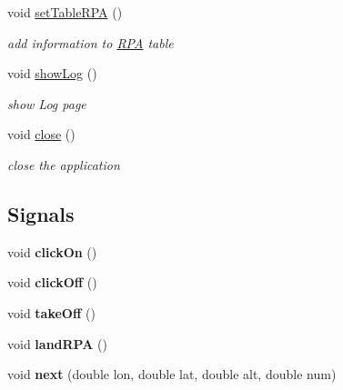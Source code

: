 \begin{DoxyCompactItemize}
\item 
void \hyperlink{class_m_a_r_c_s_aba417ab51a8036d3c855a06c1ce18f6c}{set\-Table\-R\-P\-A} ()
\begin{DoxyCompactList}\small\item\em add information to \hyperlink{class_r_p_a}{R\-P\-A} table \end{DoxyCompactList}\item 
void \hyperlink{class_m_a_r_c_s_aa04920e08a5701d7ff898baab3585277}{show\-Log} ()
\begin{DoxyCompactList}\small\item\em show Log page \end{DoxyCompactList}\item 
void \hyperlink{class_m_a_r_c_s_a21702dae09fe704ca651716e76d48e61}{close} ()
\begin{DoxyCompactList}\small\item\em close the application \end{DoxyCompactList}\end{DoxyCompactItemize}
\subsection*{Signals}
\begin{DoxyCompactItemize}
\item 
\hypertarget{class_m_a_r_c_s_a7845c604a2e589c2ae7707444976e5f6}{void {\bfseries click\-On} ()}\label{class_m_a_r_c_s_a7845c604a2e589c2ae7707444976e5f6}

\item 
\hypertarget{class_m_a_r_c_s_a00acbf98822b9e163353c24121a190a5}{void {\bfseries click\-Off} ()}\label{class_m_a_r_c_s_a00acbf98822b9e163353c24121a190a5}

\item 
\hypertarget{class_m_a_r_c_s_a8d65885e8b359fdf23384ac2a5974a6a}{void {\bfseries take\-Off} ()}\label{class_m_a_r_c_s_a8d65885e8b359fdf23384ac2a5974a6a}

\item 
\hypertarget{class_m_a_r_c_s_aacaaaa6ddc16cd252cba93bb843fb28d}{void {\bfseries land\-R\-P\-A} ()}\label{class_m_a_r_c_s_aacaaaa6ddc16cd252cba93bb843fb28d}

\item 
\hypertarget{class_m_a_r_c_s_a186f25ad0da32f9a1ee9520b6b98af44}{void {\bfseries next} (double lon, double lat, double alt, double num)}\label{class_m_a_r_c_s_a186f25ad0da32f9a1ee9520b6b98af44}

\end{DoxyCompactItemize}
